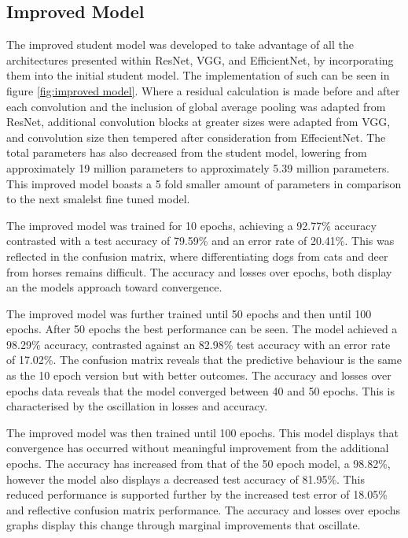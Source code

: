 \documentclass[10pt,twocolumn,letterpaper]{article}
\begin{document}
\subsection{Improved Model}
The improved student model was developed to take advantage of all the architectures presented within ResNet, VGG, and EfficientNet, by incorporating them into the initial student model. The implementation of such can be seen in figure \ref{fig:improved model}. Where a residual calculation is made before and after each convolution and the inclusion of global average pooling was adapted from ResNet, additional convolution blocks at greater sizes were adapted from VGG, and convolution size then tempered after consideration from EffecientNet. The total parameters has also decreased from the student model, lowering from approximately 19 million parameters to approximately 5.39 million parameters. This improved model boasts a 5 fold smaller amount of parameters in comparison to the next smalelst fine tuned model. 

The improved model was trained for 10 epochs, achieving a 92.77\% accuracy contrasted with a test accuracy of 79.59\% and an error rate of 20.41\%. This was reflected in the confusion matrix, where differentiating dogs from cats and deer from horses remains difficult. The accuracy and losses over epochs, both display an the models approach toward convergence.

The improved model was further trained until 50 epochs and then until 100 epochs. After 50 epochs the best performance can be seen. The model achieved a 98.29\% accuracy, contrasted against an 82.98\% test accuracy with an error rate of 17.02\%. The confusion matrix reveals that the predictive behaviour is the same as the 10 epoch version but with better outcomes. The accuracy and losses over epochs data reveals that the model converged between 40 and 50 epochs. This is characterised by the oscillation in losses and accuracy.

The improved model was then trained until 100 epochs. This model displays that convergence has occurred without meaningful improvement from the additional epochs. The accuracy has increased from that of the 50 epoch model, a 98.82\%, however the model also displays a decreased test accuracy of 81.95\%. This reduced performance is supported further by the increased test error of 18.05\% and reflective confusion matrix performance. The accuracy and losses over epochs graphs display this change through marginal improvements that oscillate.
\end{document}
